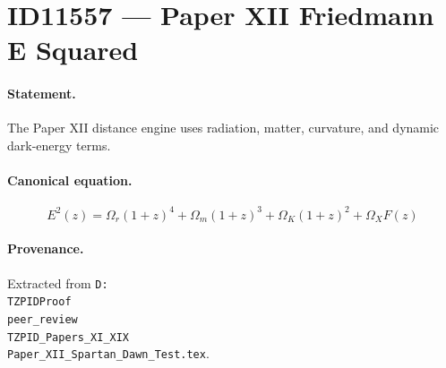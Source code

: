 \section*{ID11557 --- Paper XII Friedmann E Squared}

\paragraph{Statement.}
The Paper XII distance engine uses radiation, matter, curvature, and dynamic dark-energy terms.

\paragraph{Canonical equation.}
\[
E^2(z)=\Omega_r(1+z)^4+\Omega_m(1+z)^3+\Omega_K(1+z)^2+\Omega_XF(z)
\]

\paragraph{Provenance.}
Extracted from \texttt{D:\\TZPIDProof\\peer\_review\\TZPID\_Papers\_XI\_XIX\\Paper\_XII\_Spartan\_Dawn\_Test.tex}.
